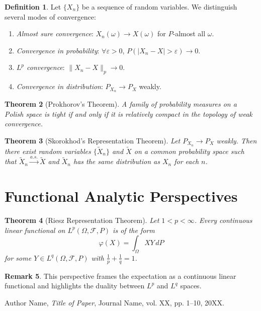 \documentclass[11pt,reqno]{amsart}
\newtheorem{theorem}{Theorem}[section]
\theoremstyle{definition}
\newtheorem{definition}[theorem]{Definition}
\newtheorem{remark}[theorem]{Remark}
\theoremstyle{remark}
\begin{document}
\begin{definition}
	Let $\{X_n\}$ be a sequence of random variables. We distinguish several modes of convergence:
	\begin{enumerate}[label=(\roman*)]
		\item \emph{Almost sure convergence}: $X_n(\omega) \to X(\omega)$ for $P$-almost all $\omega$.
		\item \emph{Convergence in probability}: $\forall \varepsilon>0$, $P(|X_n - X| > \varepsilon) \to 0$.
		\item \emph{$L^p$ convergence}: $\|X_n - X\|_p \to 0$.
		\item \emph{Convergence in distribution}: $P_{X_n} \to P_X$ weakly.
	\end{enumerate}
\end{definition}

\begin{theorem}[Prokhorov's Theorem]
	A family of probability measures on a Polish space is tight if and only if it is relatively compact in the topology of weak convergence.
\end{theorem}

\begin{theorem}[Skorokhod's Representation Theorem]
	Let $P_{X_n} \to P_X$ weakly. Then there exist random variables $\{\tilde{X}_n\}$ and $\tilde{X}$ on a common probability space such that $\tilde{X}_n \xrightarrow{a.s.} \tilde{X}$ and $\tilde{X}_n$ has the same distribution as $X_n$ for each $n$.
\end{theorem}

\section{Functional Analytic Perspectives}

\begin{theorem}[Riesz Representation Theorem]
	Let $1 < p < \infty$. Every continuous linear functional on $L^p(\Omega, \mathcal{F}, P)$ is of the form
	\[
		\varphi(X) = \int_\Omega X Y \, dP
	\]
	for some $Y \in L^q(\Omega, \mathcal{F}, P)$ with $\frac{1}{p} + \frac{1}{q}=1$.
\end{theorem}

\begin{remark}
	This perspective frames the expectation as a continuous linear functional and highlights the duality between $L^p$ and $L^q$ spaces.
\end{remark}


\begin{thebibliography}{9}

	Author Name, \emph{Title of Paper}, Journal Name, vol. XX, pp. 1--10, 20XX.

\end{thebibliography}
\end{document}
